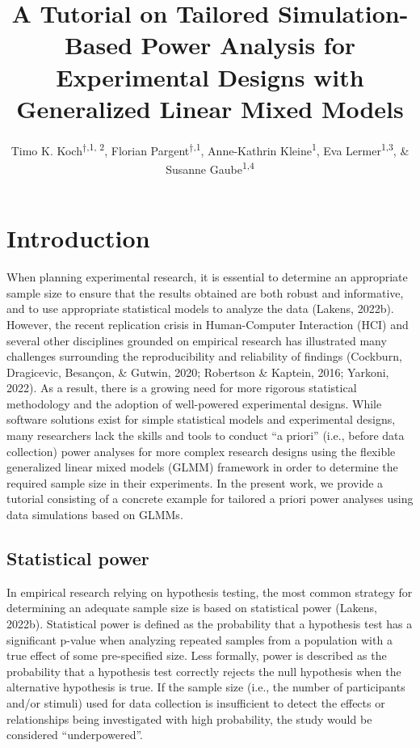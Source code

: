 \documentclass[
  man,floatsintext]{apa6}
\title{A Tutorial on Tailored Simulation-Based Power Analysis for Experimental Designs with Generalized Linear Mixed Models}
\author{Timo K. Koch\textsuperscript{$\dagger{}$,1, 2}, Florian Pargent\textsuperscript{$\dagger{}$,1}, Anne-Kathrin Kleine\textsuperscript{1}, Eva Lermer\textsuperscript{1,3}, \& Susanne Gaube\textsuperscript{1,4}}
\date{}
\affiliation{\vspace{0.5cm}\textsuperscript{1} LMU Munich, Department of Psychology\\\textsuperscript{2} University of St.~Gallen, Institute of Behavioral Science \& Technology\\\textsuperscript{3} Technical University of Applied Sciences Augsburg, Department of Business Psychology\\\textsuperscript{4} University College London, Global Business School for Health}
\begin{document}
\maketitle

\hypertarget{introduction}{%
\section{Introduction}\label{introduction}}

When planning experimental research, it is essential to determine an appropriate sample size to ensure that the results obtained are both robust and informative, and to use appropriate statistical models to analyze the data (Lakens, 2022b). However, the recent replication crisis in Human-Computer Interaction (HCI) and several other disciplines grounded on empirical research has illustrated many challenges surrounding the reproducibility and reliability of findings (Cockburn, Dragicevic, Besançon, \& Gutwin, 2020; Robertson \& Kaptein, 2016; Yarkoni, 2022). As a result, there is a growing need for more rigorous statistical methodology and the adoption of well-powered experimental designs. While software solutions exist for simple statistical models and experimental designs, many researchers lack the skills and tools to conduct ``a priori'' (i.e., before data collection) power analyses for more complex research designs using the flexible generalized linear mixed models (GLMM) framework in order to determine the required sample size in their experiments. In the present work, we provide a tutorial consisting of a concrete example for tailored a priori power analyses using data simulations based on GLMMs.

\hypertarget{statistical-power}{%
\subsection{Statistical power}\label{statistical-power}}

In empirical research relying on hypothesis testing, the most common strategy for determining an adequate sample size is based on statistical power (Lakens, 2022b). Statistical power is defined as the probability that a hypothesis test has a significant p-value when analyzing repeated samples from a population with a true effect of some pre-specified size. Less formally, power is described as the probability that a hypothesis test correctly rejects the null hypothesis when the alternative hypothesis is true. If the sample size (i.e., the number of participants and/or stimuli) used for data collection is insufficient to detect the effects or relationships being investigated with high probability, the study would be considered ``underpowered''.
\end{document}
